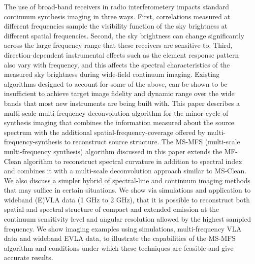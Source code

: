 \documentclass[structabstract]{stylefiles/aa}
\begin{document}
  \abstract
   {The use of broad-band receivers in radio interferometery impacts standard continuum
    synthesis imaging in three ways. 
    First, correlations measured at different frequencies sample the visibility function of the
   sky brightness at different spatial frequencies.
    Second, the sky brightness can change significantly across the large frequency 
    range that these receivers are sensitive to.
    Third, direction-dependent instrumental effects such as the element response pattern
     also vary with frequency, and this 
    affects the spectral characteristics of the measured sky brightness during wide-field
    continuum imaging.
    Existing algorithms designed to account for some of the above, can be shown to be
    insufficient to achieve target image fidelity and dynamic range over the wide bands that 
    most new instruments are being built with.}
   {This paper describes a multi-scale multi-frequency deconvolution algorithm for
    the minor-cycle of 
synthesis imaging that combines the information measured about the source spectrum
    with the additional spatial-frequency-coverage offered by multi-frequency-synthesis to 
    reconstruct source structure.} %
   {
The MS-MFS (multi-scale multi-frequency synthesis) algorithm discussed in this
paper extends the MF-Clean algorithm to reconstruct spectral curvature in 
addition to spectral index and combines it with a multi-scale deconvolution approach
similar to MS-Clean.
   We also discuss a simpler hybrid of spectral-line and continuum imaging methods
   that may suffice in certain situations.
   }
   {We show via simulations and application to wideband (E)VLA data (1 GHz to 2 GHz),
    that it is possible to reconstruct both spatial and spectral structure of 
    compact and extended emission at the continuum sensitivity level and
    angular resolution allowed by the highest sampled frequency.
   We show imaging examples using simulations, multi-frequency VLA data
    and wideband EVLA data,  to illustrate the capabilities of the MS-MFS algorithm
    and conditions under which these techniques are feasible and give accurate results.
   }
   {}
\end{document}
